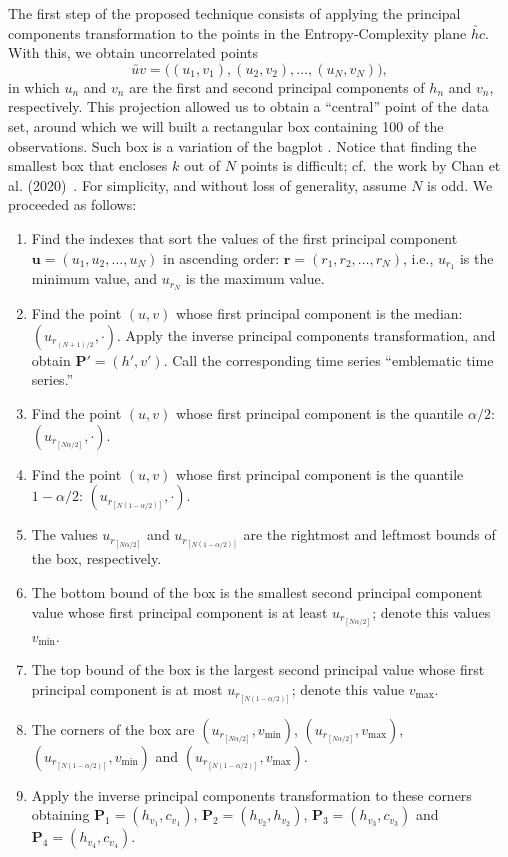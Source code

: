 \documentclass[a4,11pt]{pssbmac}
\begin{document}
The first step of the proposed technique consists of applying the principal components transformation to the points in the Entropy-Complexity plane $\utilde{hc}$.
With this, we obtain uncorrelated points 
$$\utilde{uv}=\big((u_1,v_1), (u_2,v_2),\dots,(u_N,v_N)\big),$$ 
in which $u_n$ and $v_n$ are the first and second principal components of $h_n$ and $v_n$, respectively.
This projection allowed us to obtain a ``central'' point of the data set, around which we will built a rectangular box containing \SI{100}{\minusalphapercent} of the observations.
Such box is a variation of the bagplot \cite{TheBagplotaBivariateBoxplot}.
Notice that finding the smallest box that encloses $k$ out of $N$ points is difficult; cf.\ the work by Chan et al. (2020)~\cite{SmallestKEnclosingRectangleRevisited}.
For simplicity, and without loss of generality, assume $N$ is odd.
We proceeded as follows:
\begin{enumerate}
	\item Find the indexes that sort the values of the first principal component $\bm u=(u_1,u_2,\dots,u_N)$ in ascending order: $\bm r=(r_1,r_2,\dots,r_N)$, i.e., $u_{r_1}$ is the minimum value, and $u_{r_N}$ is the maximum value.
	\item\label{item:Median} Find the point $(u,v)$ whose first principal component is the median: $(u_{r_{(N+1)/2}}, \cdot)$. Apply the inverse principal components transformation, and obtain $\bm P'=(h',v')$. Call the corresponding time series ``emblematic time series.''
	\item\label{item:Point1} Find the point $(u,v)$ whose first principal component is the quantile $\alpha/2$: $(u_{r_{[N\alpha/2]}}, \cdot)$.
	\item\label{item:Point2} Find the point $(u,v)$ whose first principal component is the quantile $1-\alpha/2$: $(u_{r_{[N(1-\alpha/2)]}}, \cdot)$.
	\item\label{item:Point3} The values $u_{r_{[N\alpha/2]}}$ and $u_{r_{[N(1-\alpha/2)]}}$ are the rightmost and leftmost bounds of the box, respectively.
	\item\label{item:Point4} The bottom bound of the box is the smallest second principal component value whose first principal component is at least $u_{r_{[N\alpha/2]}}$; denote this values $v_{\min}$.
	\item\label{item:Point5} The top bound of the box is the largest second principal value whose first principal component is at most $u_{r_{[N(1-\alpha/2)]}}$; denote this value $v_{\max}$.
	\item The corners of the box are 
	$(u_{r_{[N\alpha/2]}}, v_{\min})$, 
	$(u_{r_{[N\alpha/2]}}, v_{\max})$, 
	$(u_{r_{[N(1-\alpha/2)]}}, v_{\min})$ and 
	$(u_{r_{[N(1-\alpha/2)]}},v_{\max})$.
	\item\label{item:BoxHxC} Apply the inverse principal components transformation to these corners obtaining $\bm P_1=(h_{v_1}, c_{v_1})$, $\bm P_2=(h_{v_2},h_{v_2})$, $\bm P_3=(h_{v_3}, c_{v_3})$ and $\bm P_4=(h_{v_4},c_{v_4})$.
\end{enumerate}
\end{document}
